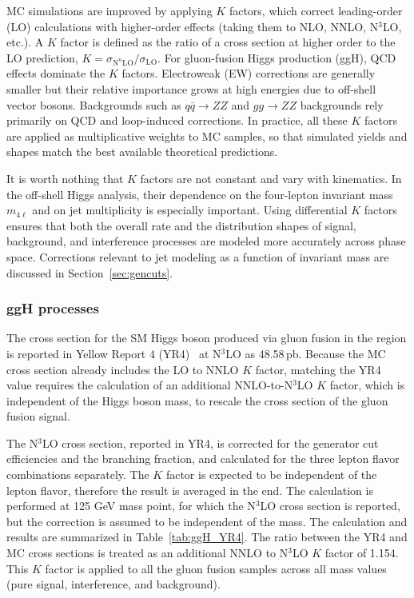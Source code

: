 MC simulations are improved by applying $K$ factors, which correct leading-order (LO) calculations with higher-order effects (taking them to NLO, NNLO, N$^3$LO, etc.). A $K$ factor is defined as the ratio of a cross section at higher order to the LO prediction, $K = \sigma_{\text{N}^n\text{LO}} / \sigma_{\text{LO}}$. For gluon-fusion Higgs production (ggH), QCD effects dominate the $K$ factors. Electroweak (EW) corrections are generally smaller but their relative importance grows at high energies due to off-shell vector bosons. Backgrounds such as $q\bar{q} \to ZZ$ and $gg \to ZZ$ backgrounds rely primarily on QCD and loop-induced corrections. In practice, all these $K$ factors are applied as multiplicative weights to MC samples, so that simulated yields and shapes match the best available theoretical predictions.

It is worth nothing that $K$ factors are not constant and vary with kinematics. In the off-shell Higgs analysis, their dependence on the four-lepton invariant mass $m_{4\ell}$ and on jet multiplicity is especially important. 
Using differential $K$ factors ensures that both the overall rate and the distribution shapes of signal, background, and interference processes are modeled more accurately across phase space. Corrections relevant to jet modeling as a function of invariant mass are discussed in Section~\ref{sec:gencuts}.

\subsubsection{ggH processes}

The cross section for the SM Higgs boson produced via gluon fusion in the \onshell region is reported in Yellow Report 4 (YR4)~\cite{YellowRep4} at N$^3$LO as 48.58\,pb. Because the MC cross section already includes the LO to NNLO $K$ factor, matching the YR4 value requires the calculation of an additional NNLO-to-N$^3$LO $K$ factor, which is independent of the Higgs boson mass, to rescale the cross section of the \onshell gluon fusion signal.

The N$^3$LO cross section, reported in YR4, is corrected for the generator cut efficiencies and the \Hboson branching fraction,
and calculated for the three lepton flavor combinations separately. The $K$ factor is expected to be independent of
the lepton flavor, therefore the result is averaged in the end. The calculation is performed at 125 GeV mass point,
for which the N$^3$LO cross section is reported, but the correction is assumed to be independent of the mass. 
The calculation and results are summarized in Table~\ref{tab:ggH_YR4}. 
The ratio between the YR4 and MC cross sections is treated as an additional NNLO to N$^3$LO $K$ factor of 1.154.
This $K$ factor is applied to all the gluon fusion samples across all mass values (pure signal, interference, and background).

